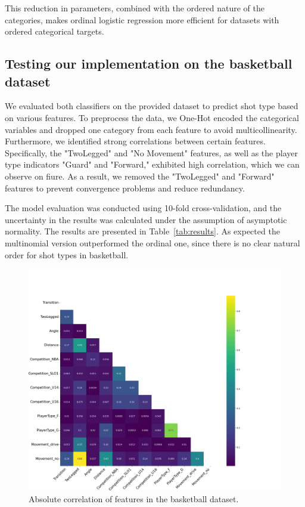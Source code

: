 \documentclass[9pt]{IEEEtran}
\begin{document}
  This reduction in parameters, combined with the ordered nature 
  of the categories, makes ordinal logistic regression more efficient
   for datasets with ordered categorical targets.

\subsection{Testing our implementation on the basketball dataset}
We evaluated both classifiers on the provided dataset to predict
 shot type based on various features. To preprocess the data, we One-Hot encoded 
 the categorical variables and dropped one category from each feature
  to avoid multicollinearity. Furthermore, we identified strong correlations
   between certain features. Specifically, the "TwoLegged" and "No Movement"
    features, as well as the player type indicators "Guard" and "Forward,"
     exhibited high correlation, which we can observe on fiure. As a result, we removed the "TwoLegged" 
     and "Forward" features to prevent convergence problems and reduce 
     redundancy.

The model evaluation was conducted using 10-fold cross-validation, 
and the uncertainty in the results was calculated under the assumption 
of asymptotic normality. The results are presented in 
Table~\ref{tab:results}. As expected the multinomial version outperformed the 
ordinal one, since there is no clear natural order for shot types in 
basketball.


\begin{figure}[h]
    \centering
    \includegraphics[width=0.99\columnwidth]{figures/corr.png}
    \caption{Absolute correlation of features in the basketball dataset.}
    \label{fig:corr}
\end{figure}
\end{document}
